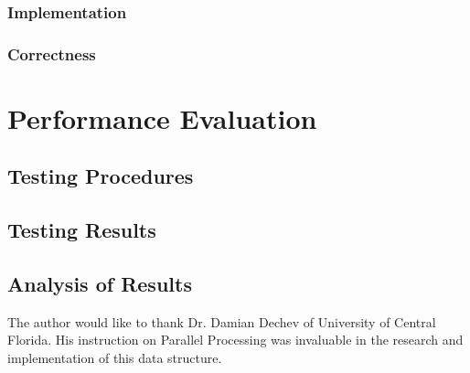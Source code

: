 \subsubsection{Implementation}
\subsubsection{Correctness}

\section{Performance Evaluation}


\subsection{Testing Procedures}

\subsection{Testing Results}

\subsection{Analysis of Results}


\begin{acks}

The author would like to thank Dr. Damian Dechev of University of Central Florida. His instruction on Parallel Processing was invaluable in the research and implementation of this data structure. 

\end{acks}


